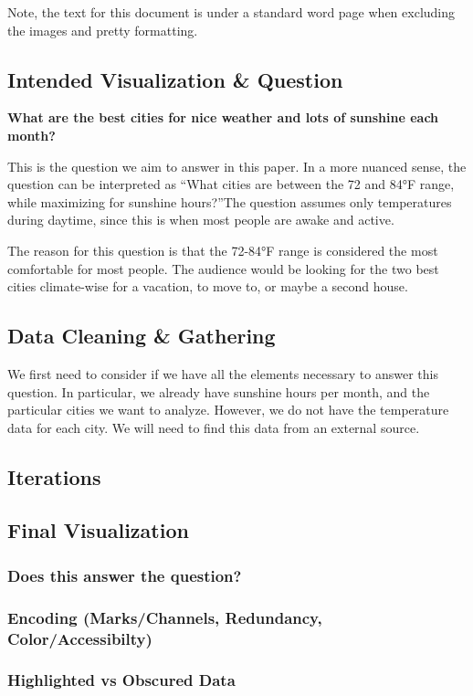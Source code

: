 \documentclass{article}
\begin{document}
\newpage
Note, the text for this document is under a standard word page when excluding the images and pretty formatting. 

\subsection{Intended Visualization \& Question}

\textbf{What are the best cities for nice weather and lots of sunshine each month?}

This is the question we aim to answer in this paper. In a more nuanced sense,
the question can be interpreted as \textquotedblleft What cities are between the 72 and 84°F
range, while maximizing for sunshine hours?\textquotedblright The question assumes only temperatures during daytime, since this 
is when most people are awake and active.

The reason for this question is that the 72-84°F range is considered the most comfortable for most people. 
The audience would be looking for the two best cities climate-wise for a vacation, to move to, or maybe a second house.

\subsection{Data Cleaning \& Gathering}

We first need to consider if we have all the elements necessary to answer this question.
In particular, we already have sunshine hours per month, and the particular cities we want to analyze.
However, we do not have the temperature data for each city. We will need to find this data from an external source.

\subsection{Iterations}

\subsection{Final Visualization}
\subsubsection{Does this answer the question?}
\subsubsection{Encoding (Marks/Channels, Redundancy, Color/Accessibilty)}
\subsubsection{Highlighted vs Obscured Data}



\end{document}
